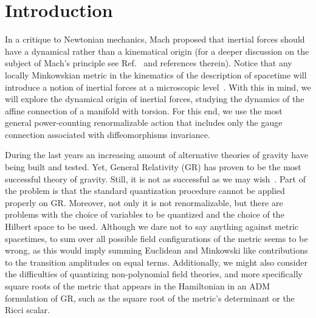 \documentclass[twocolumn,aps,
  showpacs,showkeys,prd,superscriptaddress]{revtex4-1}
\renewcommand{\(}{\left(}
\renewcommand{\)}{\right)}
\renewcommand{\[}{\left[}
\renewcommand{\]}{\right]}
\begin{document}
\section{Introduction}

In a critique to Newtonian mechanics, Mach proposed that inertial forces should have a dynamical rather than a kinematical origin (for a deeper discussion on the subject of Mach's principle see Ref.~\cite{Lichtenegger:2004re} and references therein).
Notice that any locally Minkowskian metric in the kinematics of the description of spacetime will introduce a notion of inertial forces at a microscopic level~\cite{Sciama:1964wt}. With this in mind, we will explore the dynamical origin of inertial forces, studying the dynamics of the affine connection of a manifold with torsion. For this end, we use the most general power-counting renormalizable action that includes only the gauge connection associated with diffeomorphisms invariance.

During the last years an increasing amount of alternative theories of gravity have being built and tested. Yet, General Relativity (GR) has proven to be the most successful theory of gravity.  Still,  it is not as successful as we may wish~\cite{Kiefer:2013jqa}. Part of the problem is that the standard quantization procedure cannot be applied  properly on GR. Moreover, not only it is not renormalizable, but there are  problems with the choice of variables to be quantized and the choice of the Hilbert space to be used. Although we dare not to say anything against metric spacetimes, to sum over all possible field configurations of the metric seems to be wrong, as this would imply summing Euclidean and Minkowski like contributions to the transition amplitudes on equal terms. Additionally, we might also consider the difficulties of  quantizing  non-polynomial field theories, and more specifically square roots of the metric that appears in the Hamiltonian in an ADM formulation of GR, such as the square root of the metric's determinant or the Ricci scalar.
\end{document}
